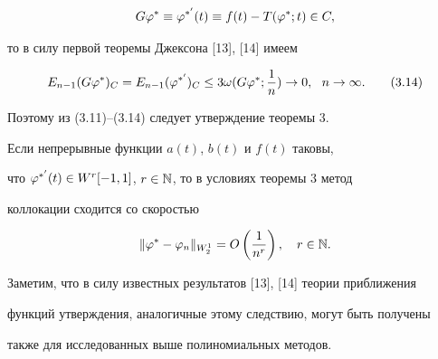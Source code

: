 $$


G\vp^{*}\equiv\vp^{*'}(t)\equiv f(t)-T(\vp^{*};t)\in C,


$$


то в силу первой теоремы Джексона [13], [14] имеем


\begin{equation}


E_{n-1}(G\vp^{*})_C=E_{n-1}(\vp^{*'})_C\le


3\omega (G\vp^{*};\frac{1}{n})\to 0, \ \ n\to\infty.


\tag{3.14}


\end{equation}


Поэтому из (3.11)--(3.14) следует утверждение теоремы 3.





\begin{cornonum}


Если непрерывные функции $a(t)$, $b(t)$ и $f(t)$ таковы, 


что $\varphi^{*'}(t)\in W^r[-1,1]$, $r\in\Bbb N$, то в условиях теоремы 3 метод 


коллокации сходится со скоростью


$$


\|\vp^*-\vp_n\|_{W^1_2}=O\left(\frac{1}{n^r}\right),\quad r\in\N.


$$


\end{cornonum}





Заметим, что в силу известных результатов [13], [14] теории приближения


функций утверждения, аналогичные этому следствию, могут быть получены


также для исследованных выше полиномиальных методов. 





